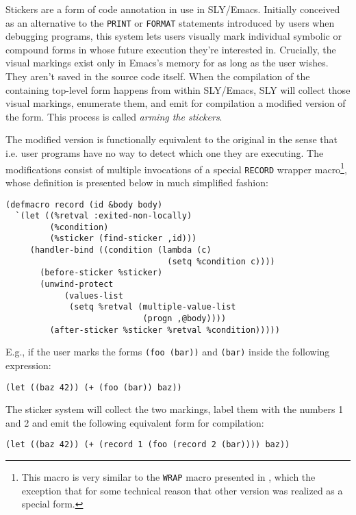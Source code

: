 \documentclass[sigconf]{acmart}
\begin{document}
Stickers are a form of code annotation in use in SLY/Emacs.  Initially
conceived as an alternative to the \texttt{PRINT} or \texttt{FORMAT}
statements introduced by users when debugging programs, this system
lets users visually mark individual symbolic or compound forms in
whose future execution they're interested in.  Crucially, the visual
markings exist only in Emacs's memory for as long as the user
wishes. They aren't saved in the source code itself.  When the
compilation of the containing top-level form happens from within
SLY/Emacs, SLY will collect those visual markings, enumerate them, and
emit for compilation a modified version of the form.  This process is
called \emph{arming the stickers}.

The modified version is functionally equivalent to the original in the
sense that i.e. user programs have no way to detect which one they are
executing.  The modifications consist of multiple invocations of a
special \texttt{RECORD} wrapper macro\footnote{This macro is very
  similar to the \texttt{WRAP} macro presented in
  \cite{annotation-based}, which the exception that for some technical
  reason that other version was realized as a special form.}, whose
definition is presented below in much simplified fashion:

\begin{verbatim}
(defmacro record (id &body body)
  `(let ((%retval :exited-non-locally)
         (%condition)
         (%sticker (find-sticker ,id)))
     (handler-bind ((condition (lambda (c)
                                 (setq %condition c))))
       (before-sticker %sticker)
       (unwind-protect
            (values-list
             (setq %retval (multiple-value-list
                            (progn ,@body))))
         (after-sticker %sticker %retval %condition)))))
\end{verbatim}

E.g., if the user marks the forms \texttt{(foo (bar))} and
\texttt{(bar)} inside the following expression:

\begin{verbatim}
(let ((baz 42)) (+ (foo (bar)) baz))
\end{verbatim}

The sticker system will collect the two markings, label them with the
numbers 1 and 2 and emit the following equivalent form for
compilation:

\begin{verbatim}
(let ((baz 42)) (+ (record 1 (foo (record 2 (bar)))) baz))
\end{verbatim}
\end{document}
